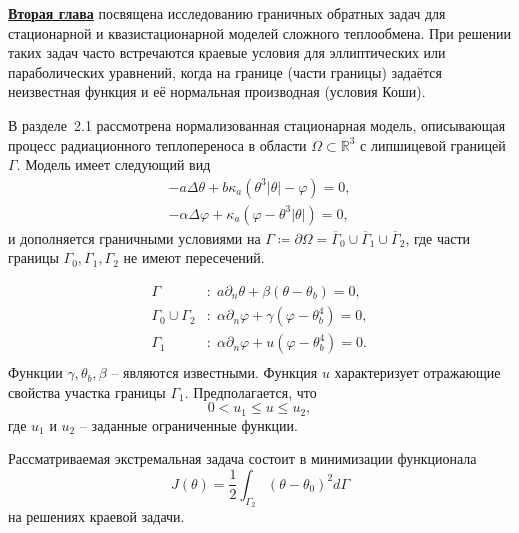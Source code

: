 \underline{\textbf{Вторая глава}} посвящена исследованию граничных обратных задач для
стационарной и квазистационарной моделей сложного теплообмена.
При решении таких задач часто встречаются краевые условия для
эллиптических или параболических уравнений,
когда на границе (части границы) задаётся неизвестная функция
и её нормальная производная (условия Коши).


В разделе~2.1 рассмотрена нормализованная стационарная модель,
описывающая процесс радиационного теплопереноса в
области $\Omega \subset \mathbb{R}^3$ с липшицевой границей $\Gamma$.
Модель имеет следующий вид
\begin{equation}
    \label{eq:2_1:initial}
    \begin{aligned}
        - a \Delta \theta + b \kappa_a(\theta ^ 3 | \theta | - \varphi) = 0,  \\
        - \alpha \Delta \varphi + \kappa_a (\varphi - \theta ^3 | \theta |) = 0,
    \end{aligned}
\end{equation}
и дополняется граничными условиями на
$\Gamma \coloneqq \partial \Omega =\overline{\Gamma}_0 \cup \overline{\Gamma}_1 \cup \overline{\Gamma}_2$,
где части границы $\Gamma_0, \Gamma_1, \Gamma_2$ не имеют пересечений.

\begin{equation}
    \label{eq:2_1:initial-boundary}
    \begin{aligned}
        \Gamma &: \; a \partial_n \theta + \beta (\theta - \theta _b) = 0, \\
        \Gamma_0 \cup \Gamma_2 &: \; \alpha \partial_n \varphi
        + \gamma(\varphi - \theta_b ^4 ) = 0, \\
        \Gamma_1 &: \; \alpha \partial_n \varphi + u(\varphi - \theta_b ^4 ) = 0. \\
    \end{aligned}
\end{equation}
Функции $\gamma, \theta_b, \beta$ -- являются известными.
Функция $u$ характеризует отражающие свойства участка границы $\Gamma_1$.
Предполагается, что
\begin{equation}
    \label{eq:2_1:control_bounds}
    0 < u_1 \leq u \leq u_2,
\end{equation}
где $u_1$ и $u_2$ -- заданные ограниченные функции.

Рассматриваемая экстремальная задача состоит в минимизации функционала
\begin{equation}
    \label{eq:2_1:quality}
    J(\theta) = \frac{1}{2} \int_{\Gamma_2} (\theta - \theta_0)^2 d\Gamma
\end{equation}
на решениях краевой задачи.

